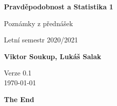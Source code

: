\documentclass[11pt]{article}
\theoremstyle{nontheoremstyle}
\theoremstyle{nontheoremstylenodot}
\theoremstyle{theoremstyle}
\begin{document}
\begin{titlepage}
    \begin{center}
        \vspace*{1cm}
            
        \Huge
        \textbf{Pravděpodobnost a Statistika 1}
            
        \vspace{0.5cm}
        \LARGE
        Poznámky z přednášek

        \vspace{5mm}
        
        Letní semestr 2020/2021
        
        \vspace{1.5cm}
            
        \textbf{Viktor Soukup, Lukáš Salak}
        
        \vfill
        \flushright
        \normalsize
        Verze 0.1\\
        \today
        
    \end{center}
\end{titlepage}

\tableofcontents
\clearpage







\vfill
\begin{center}
\LARGE
\textbf{The End}
\end{center}
\end{document}
